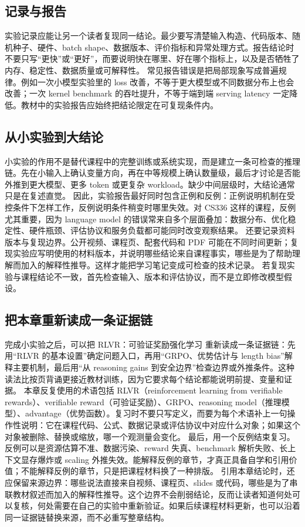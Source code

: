 \documentclass[a4paper]{article}
\begin{document}
\subsection{记录与报告}
实验记录应能让另一个读者复现同一结论。最少要写清楚输入构造、代码版本、随机种子、硬件、batch shape、数据版本、评价指标和异常处理方式。报告结论时不要只写“更快”或“更好”，而要说明快在哪里、好在哪个指标上，以及是否牺牲了内存、稳定性、数据质量或可解释性。
常见报告错误是把局部现象写成普遍规律。例如一次小模型实验里的 loss 改善，不等于更大模型或不同数据分布上也会改善；一次 kernel benchmark 的吞吐提升，不等于端到端 serving latency 一定降低。教材中的实验报告应始终把结论限定在可复现条件内。
\subsection{从小实验到大结论}
小实验的作用不是替代课程中的完整训练或系统实现，而是建立一条可检查的推理链。先在小输入上确认变量方向，再在中等规模上确认数量级，最后才讨论是否能外推到更大模型、更多 token 或更复杂 workload。缺少中间层级时，大结论通常只是在复述直觉。
因此，实验报告最好同时包含正例和反例：正例说明机制在受控条件下怎样工作，反例说明条件稍变时哪里失效。对 CS336 这样的课程，反例尤其重要，因为 language model 的错误常来自多个层面叠加：数据分布、优化稳定性、硬件瓶颈、评估协议和服务负载都可能同时改变观察结果。
还要记录资料版本与复现边界。公开视频、课程页、配套代码和 PDF 可能在不同时间更新；复现实验应写明使用的材料版本，并说明哪些结论来自课程事实，哪些是为了帮助理解而加入的解释性推导。这样才能把学习笔记变成可检查的技术记录。
若复现实验与课程结论不一致，首先检查输入、版本和评估协议，而不是立即修改模型假设。
\subsection{把本章重新读成一条证据链}
完成小实验之后，可以把 RLVR：可验证奖励强化学习 重新读成一条证据链：先用“RLVR 的基本设置”确定问题入口，再用“GRPO、优势估计与 length bias”解释主要机制，最后用“从 reasoning gains 到安全边界”检查边界或外推条件。这种读法比按页背诵更接近教材训练，因为它要求每个结论都能说明前提、变量和证据。
本章反复使用的术语包括 RLVR（reinforcement learning from verifiable rewards）、verifiable reward（可验证奖励）、GRPO、reasoning model（推理模型）、advantage（优势函数）。复习时不要只写定义，而要为每个术语补上一句操作性说明：它在课程代码、公式、数据记录或评估协议中对应什么对象；如果这个对象被删除、替换或缩放，哪一个观测量会变化。
最后，用一个反例结束复习。反例可以是资源估算不准、数据污染、reward 失真、benchmark 解析失败、长上下文显存爆炸或 scaling 外推失效。能解释反例的章节，才真正具备自学和引用价值；不能解释反例的章节，只是把课程材料换了一种排版。
引用本章结论时，还应保留来源边界：哪些说法直接来自视频、课程页、slides 或代码，哪些是为了串联教材叙述而加入的解释性推导。这个边界不会削弱结论，反而让读者知道何处可以复核，何处需要在自己的实验中重新验证。如果后续课程材料更新，也可以沿着同一证据链替换来源，而不必重写整章结构。
\end{document}

